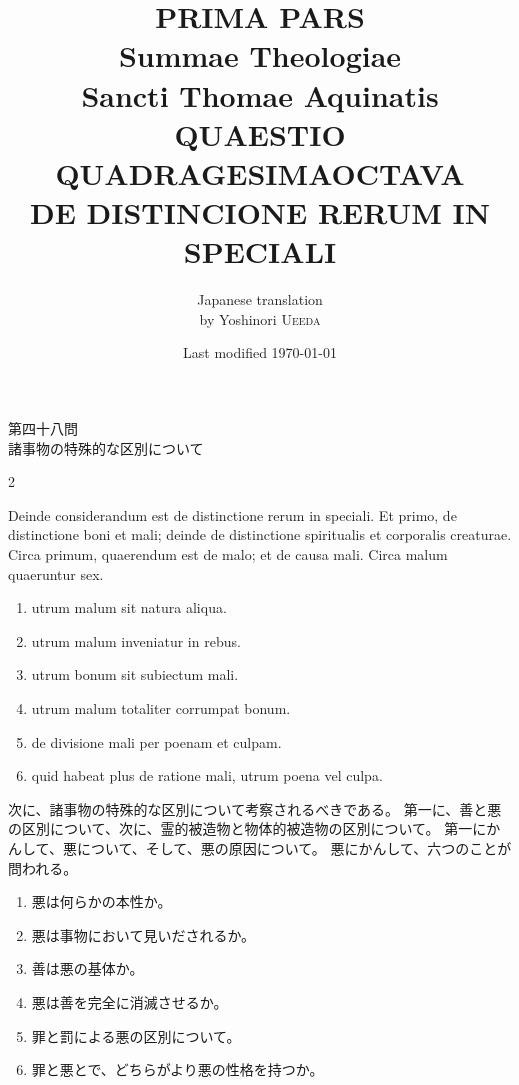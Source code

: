 \documentclass[paper=a4paper,fontsize=10pt,jafontsize=9pt,titlepage]{jlreq}
\title{{\bfseries PRIMA PARS}\\{\Huge Summae Theologiae}\\Sancti Thomae
Aquinatis\\{\sffamily QUAESTIO QUADRAGESIMAOCTAVA}\\DE DISTINCIONE RERUM IN SPECIALI}
\author{Japanese translation\\by Yoshinori {\scshape Ueeda}}
\date{Last modified \today}
\begin{document}
\maketitle

\begin{center}
{\Large 第四十八問\\
諸事物の特殊的な区別について}
\end{center}

\begin{paracol}{2}

Deinde considerandum est de distinctione rerum in speciali. Et primo, de
distinctione boni et mali; deinde de distinctione spiritualis et
corporalis creaturae. Circa primum, quaerendum est de malo; et de causa
mali. Circa malum quaeruntur sex. 

\begin{enumerate}
 \item utrum malum sit natura aliqua. 
 \item utrum malum inveniatur in rebus.
 \item utrum bonum sit subiectum mali.
 \item utrum malum totaliter corrumpat bonum.
 \item de divisione mali per poenam et culpam.
 \item quid habeat plus de ratione mali, utrum poena vel culpa.
\end{enumerate}

\switchcolumn

次に、諸事物の特殊的な区別について考察されるべきである。
第一に、善と悪の区別について、次に、霊的被造物と物体的被造物の区別について。
第一にかんして、悪について、そして、悪の原因について。
悪にかんして、六つのことが問われる。

\begin{enumerate}
 \item 悪は何らかの本性か。
 \item 悪は事物において見いだされるか。
 \item 善は悪の基体か。
 \item 悪は善を完全に消滅させるか。
 \item 罪と罰による悪の区別について。
 \item 罪と悪とで、どちらがより悪の性格を持つか。
\end{enumerate}

\end{paracol}
\newpage
{}
{}
\setcounter{section}{1}
\setcounter{subsection}{0}
\end{document}
